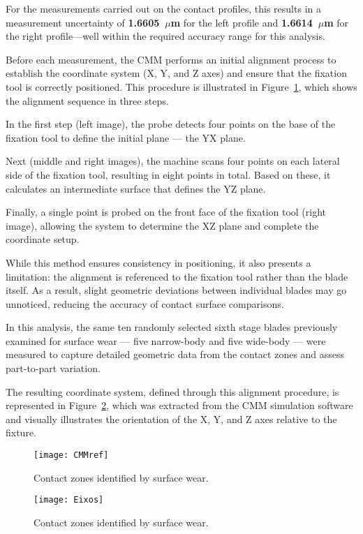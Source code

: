 For the measurements carried out on the contact profiles, this results in a measurement uncertainty of \textbf{1.6605~$\mu$m} for the left profile and \textbf{1.6614~$\mu$m} for the right profile---well within the required accuracy range for this analysis.


Before each measurement, the CMM performs an initial alignment process to establish the coordinate system (X, Y, and Z axes) and ensure that the fixation tool is correctly positioned. This procedure is illustrated in Figure~\ref{fig:CMMref}, which shows the alignment sequence in three steps.

In the first step (left image), the probe detects four points on the base of the fixation tool to define the initial plane — the YX plane.

Next (middle and right images), the machine scans four points on each lateral side of the fixation tool, resulting in eight points in total. Based on these, it calculates an intermediate surface that defines the YZ plane.

Finally, a single point is probed on the front face of the fixation tool (right image), allowing the system to determine the XZ plane and complete the coordinate setup.

While this method ensures consistency in positioning, it also presents a limitation: the alignment is referenced to the fixation tool rather than the blade itself. As a result, slight geometric deviations between individual blades may go unnoticed, reducing the accuracy of contact surface comparisons.

In this analysis, the same ten randomly selected sixth stage blades previously examined for surface wear — five narrow-body and five wide-body — were measured to capture detailed geometric data from the contact zones and assess part-to-part variation.

The resulting coordinate system, defined through this alignment procedure, is represented in Figure~\ref{fig:Eixos}, which was extracted from the CMM simulation software and visually illustrates the orientation of the X, Y, and Z axes relative to the fixture.


\begin{figure}[H]
    \centering
    \texttt{[image: CMMref]}
    \caption{Contact zones identified by surface wear.}
    \label{fig:CMMref}
\end{figure}

\begin{figure}[H]
    \centering
    \texttt{[image: Eixos]}
    \caption{Contact zones identified by surface wear.}
    \label{fig:Eixos}
\end{figure}


